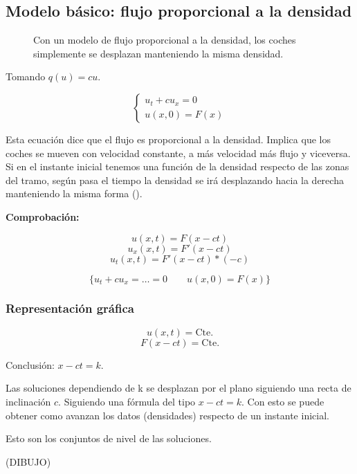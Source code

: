 	\subsection{Modelo básico: flujo proporcional a la densidad}

		\begin{figure}[hbtp]
		\centering
		\caption{Con un modelo de flujo proporcional a la densidad, los coches simplemente se desplazan manteniendo la misma densidad.}
		\label{fig:CochesModeloLineal}
		\end{figure}

		Tomando $q(u) = cu$.

		\begin{equation*}
		\left\{
		\begin{array}{l}
		u_t + cu_x = 0 \\
		u(x,0) = F(x)
		\end{array}
		\right.
		\end{equation*}


		Esta ecuación dice que el flujo es proporcional a la densidad. Implica que los coches se mueven con velocidad constante, a más velocidad más flujo y viceversa. Si en el instante inicial tenemos una función de la densidad respecto de las zonas del tramo, según pasa el tiempo la densidad se irá desplazando hacia la derecha manteniendo la misma forma ().

		\textbf{Comprobación:}

		$$ u(x,t) = F(x-ct) $$
		$$ u_x(x,t) = F'(x-ct)$$
		$$u_t(x,t) = F'(x-ct)*(-c)$$

		$$ \{ u_t + cu_x = … = 0 \quad\quad u(x,0) = F(x) \} $$

		\subsubsection{Representación gráfica}


			$$u(x,t) = \text{Cte.}$$
			$$F(x - ct) = \text{Cte.}$$

			Conclusión: $x-ct = k$.


			Las soluciones dependiendo de k se desplazan por el plano siguiendo una recta de inclinación $c$. Siguiendo una fórmula del tipo $x-ct = k$. Con esto se puede obtener como avanzan los datos (densidades) respecto de un instante inicial.

			Esto son los conjuntos de nivel de las soluciones.

			(DIBUJO)



